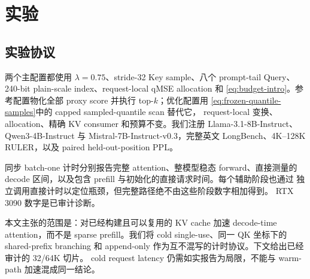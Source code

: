 \section{实验}
\label{sec:experiments}


\subsection{实验协议}

两个主配置都使用 $\lambda=0.75$、stride-32 Key sample、八个 prompt-tail Query、
240-bit plain-scale index、request-local qMSE allocation 和
\cref{eq:budget-intro}。参考配置物化全部 proxy score 并执行 top-$k$；优化配置用
\cref{eq:frozen-quantile-samples}中的 capped sampled-quantile scan 替代它，
request-local 变换、allocation、精确 KV consumer 和预算不变。我们注册
Llama-3.1-8B-Instruct、Qwen3-4B-Instruct 与
Mistral-7B-Instruct-v0.3，完整英文 LongBench、4K--128K RULER，以及 paired
held-out-position PPL。

同步 batch-one 计时分别报告完整 attention、整模型稳态 forward、直接测量的
decode 区间，以及包含 prefill 与初始化的直接请求时间。每个辅助阶段也通过
独立调用直接计时以定位瓶颈，但完整路径绝不由这些阶段数字相加得到。
RTX 3090 数字是已审计诊断。

本文主张的范围是：对已经构建且可以复用的 KV cache 加速 decode-time
attention，而不是 sparse prefill。我们将 cold single-use、同一 QK 坐标下的
shared-prefix branching 和 append-only 作为互不混写的计时协议。下文给出已经
审计的 32/64K 切片。
cold request latency 仍需如实报告为局限，不能与
warm-path 加速混成同一结论。

